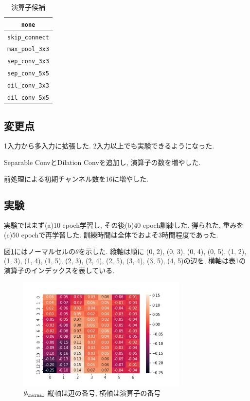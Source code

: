 \documentclass[twocolumn]{jarticle}     %
\begin{document}
\begin{table}[tb]
  \begin{center}
    \caption{演算子候補}
    \begin{tabular}{|c|} \hline
      \verb|none| \\ \hline
      \verb|skip_connect| \\ \hline
      \verb|max_pool_3x3| \\ \hline
      \verb|sep_conv_3x3| \\ \hline
      \verb|sep_conv_5x5| \\ \hline
      \verb|dil_conv_3x3| \\ \hline
      \verb|dil_conv_5x5| \\ \hline
    \end{tabular}
    \label{tab:ops}
  \end{center}
\end{table}

\subsection{変更点}
1入力から多入力に拡張した. 2入力以上でも実験できるようになった.

Separable ConvとDilation Convを追加し, 演算子の数を増やした.

前処理による初期チャンネル数を16に増やした.

\subsection{実験}
実験ではまず(a)10 epoch学習し,
その後(b)40 epoch訓練した.
得られた, 重みを(c)50 epochで再学習した.
訓練時間は全体でおよそ3時間程度であった.

図\ref{fig:theta}にはノーマルセルの$\theta$を示した.
縦軸は順に (0, 2), (0, 3), (0, 4), (0, 5), (1, 2), (1, 3), (1, 4), (1, 5), (2, 3), (2, 4), (2, 5), (3, 4), (3, 5), (4, 5)の辺を, 横軸は表\ref{tab:ops}の演算子のインデックスを表している.

\begin{figure}[tb]
	\begin{center}
		\includegraphics[clip,width=8.5cm]{theta_44.png}
		\caption{$\theta_{\normal}$ 縦軸は辺の番号, 横軸は演算子の番号}
		\label{fig:theta}
	\end{center}
\end{figure}
\end{document}
